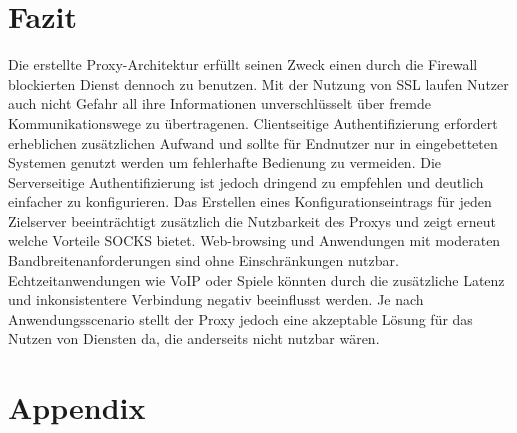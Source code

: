\documentclass[12pt, a4paper]{scrartcl}
\begin{document}
\section{Fazit}
Die erstellte Proxy-Architektur erfüllt seinen Zweck einen durch die Firewall blockierten Dienst dennoch zu benutzen. Mit der Nutzung von \ac{SSL} laufen Nutzer auch nicht Gefahr all ihre Informationen unverschlüsselt über fremde Kommunikationswege zu übertragenen. Clientseitige Authentifizierung erfordert erheblichen zusätzlichen Aufwand und sollte für Endnutzer nur in eingebetteten Systemen genutzt werden um fehlerhafte Bedienung zu vermeiden. Die Serverseitige Authentifizierung ist jedoch dringend zu empfehlen und deutlich einfacher zu konfigurieren.\newline
Das Erstellen eines Konfigurationseintrags für jeden Zielserver beeinträchtigt zusätzlich die Nutzbarkeit des Proxys und zeigt erneut welche Vorteile SOCKS bietet. Web-browsing und Anwendungen mit moderaten Bandbreitenanforderungen sind ohne Einschränkungen nutzbar. Echtzeitanwendungen wie \ac{VoIP} oder Spiele könnten durch die zusätzliche Latenz und inkonsistentere Verbindung negativ beeinflusst werden.\newline
Je nach Anwendungsscenario stellt der Proxy jedoch eine akzeptable Lösung für das Nutzen von Diensten da, die anderseits nicht nutzbar wären.

\newpage
\renewcommand{\thesubsection}{\Alph{subsection}}
\setcounter{page}{\value{lastroman}}
\section*{Appendix}


\newpage
\listoffigures

\end{document}
